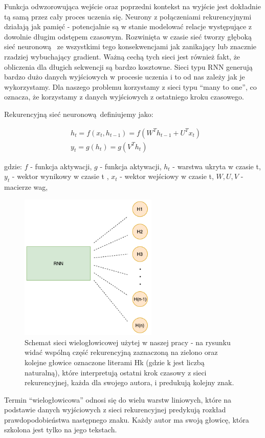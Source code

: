 Funkcja odwzorowująca wejście oraz poprzedni kontekst na wyjście jest dokładnie tą samą przez cały proces
uczenia się. Neurony z połączeniami rekurencyjnymi działają jak pamięć - potencjalnie są w stanie modelować relacje
występujące z dowolnie długim odstępem czasowym. 
Rozwinięta w czasie sieć tworzy głęboką sieć neuronową 
ze wszystkimi tego konsekwencjami jak zanikający lub znacznie rzadziej wybuchający gradient. 
Ważną cechą tych sieci jest również fakt, że obliczenia dla długich sekwencji są bardzo kosztowne.
Sieci typu RNN generują bardzo dużo danych wyjściowych w procesie uczenia i to od nas zależy jak je 
wykorzystamy. Dla naszego problemu korzystamy z sieci typu ``many to one'', co oznacza, że korzystamy
z danych wyjściowych z ostatniego kroku czasowego.

\newpage
Rekurencyjną sieć neuronową definiujemy jako:

\begin{align}
  &h_t = f(x_t, h_{t-1}) = f(W^Th_{t-1} + U^Tx_t) \\ 
  &y_t = g(h_t) = g(V^Th_t)
\end{align}


gdzie: \newline
$f$ - funkcja aktywacji, \newline
$g$ - funkcja aktywacji, \newline
$h_t$ - warstwa ukryta w czasie t, \newline
$y_t$ - wektor wynikowy w czasie t , \newline
$x_t$ - wektor wejściowy w czasie t, \newline
$W, U, V$ - macierze wag, \newline


\begin{figure}[H]
\centering
\includegraphics[height=7cm]{./images/multiheaded-rnn.png}
\caption{Schemat sieci wielogłowicowej użytej w naszej pracy - na rysunku widać wspólną część rekurencyjną zaznaczoną na zielono
oraz kolejne głowice oznaczone literami Hk (gdzie k jest liczbą naturalną), które interpretują ostatni krok czasowy z sieci rekurencyjnej, każda
dla swojego autora, i predukują kolejny znak.}
\label{fig:test5}
\end{figure}


Termin ``wielogłowicowa'' odnosi się do wielu warstw liniowych, które na podstawie danych wyjściowych z 
sieci rekurencyjnej predykują rozkład prawdopodobieństwa następnego znaku. Każdy autor ma swoją głowicę, która 
szkolona jest tylko na jego tekstach.
